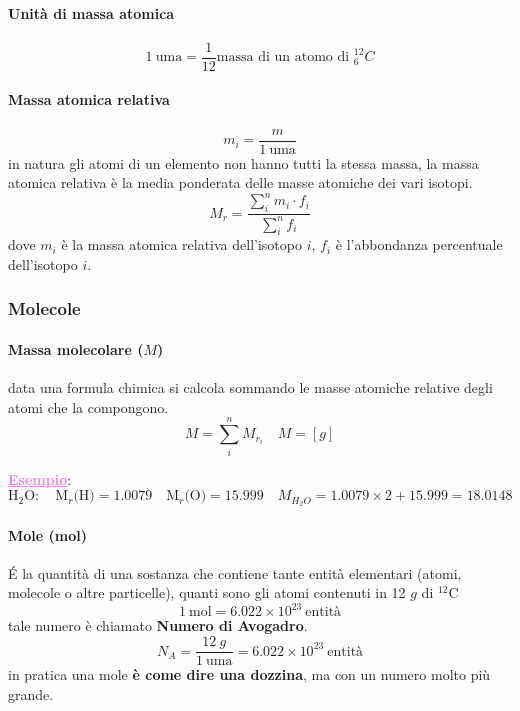 \documentclass[twoside]{article}
\begin{document}
\paragraph[short]{Unità di massa atomica}
\begin{equation}
  \boxed{1\ \text{uma} = \frac{1}{12} \text{massa di un atomo di }^{12}_{6}C}
\end{equation}
\paragraph[short]{Massa atomica relativa}
\begin{equation}
  m_{i} = \frac{m}{1\ \text{uma}}
\end{equation}
in natura gli atomi di un elemento non hanno tutti la stessa massa, la massa atomica relativa è la media ponderata delle masse atomiche dei vari isotopi.
\begin{equation}
  \boxed{M_{r} = \frac{\sum_{i}^{n} m_i \cdot f_i}{\sum_{i}^{n} f_i}}
\end{equation}
dove \(m_i\) è la massa atomica relativa dell'isotopo \(i\), \(f_i\) è l'abbondanza percentuale dell'isotopo \(i\).

\subsubsection{Molecole}

\paragraph[long]{Massa molecolare (\(M\))}
data una formula chimica si calcola sommando le masse atomiche relative degli atomi che la compongono.
\begin{equation}
  \boxed{M = \sum_{i}^{n} M_{r_i}} \quad M = \left[g\right]
\end{equation}
\begin{center}
  \small
  \begin{minipage}{0.7\textwidth}
    \textcolor{violet}{\uline{\textbf{Esempio}}}:\\
    \begin{equation*}
      \text{H}_2\text{O} : \quad \text{M}_r\text{(H)} = 1.0079 \quad \text{M}_r\text{(O)} = 15.999 \quad M_{H_{2}O} = 1.0079 \times 2 + 15.999 = 18.0148
    \end{equation*}
  \end{minipage}
\end{center}
\paragraph[long]{Mole (mol)}
\'E la quantità di una sostanza che contiene tante entità elementari (atomi, molecole o altre particelle), quanti sono gli atomi contenuti in 12 $g$ di $^{12}$C
\begin{equation*}
  1\ \text{mol} = 6.022 \times 10^{23}\ \text{entità}
\end{equation*}
tale numero è chiamato \textbf{Numero di Avogadro}.
\begin{equation*}
  N_A = \frac{12\ g}{1\ \text{uma}} = 6.022 \times 10^{23}\ \text{entità}
\end{equation*}
in pratica una mole \textbf{è come dire una dozzina}, ma con un numero molto più grande.
\end{document}
